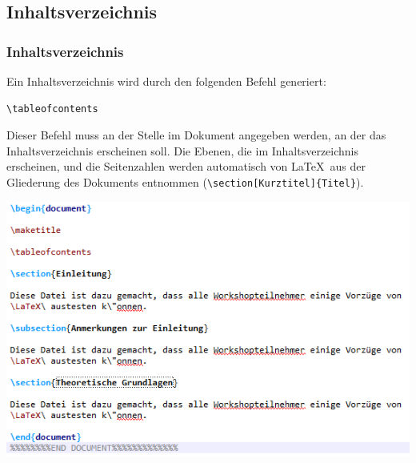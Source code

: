 \subsection{Inhaltsverzeichnis}

\begin{frame}[fragile]
\frametitle{Inhaltsverzeichnis}

Ein Inhaltsverzeichnis wird durch den folgenden Befehl generiert:
\begin{lstlisting}
\tableofcontents
\end{lstlisting}

\noindent Dieser Befehl muss an der Stelle im Dokument angegeben werden, an der das Inhaltsverzeichnis erscheinen soll. Die Ebenen, die im Inhaltsverzeichnis erscheinen, und die Seitenzahlen werden automatisch von \LaTeX\ aus der Gliederung des Dokuments entnommen (\zB \lstinline|\section[Kurztitel]{Titel}|).

\end{frame}


\begin{frame}[fragile]

\centering
\includegraphics[width=0.84\linewidth]{../../texfiles-beamer/tex-material/WissArb-latex/latexTest5tex}


\end{frame}


